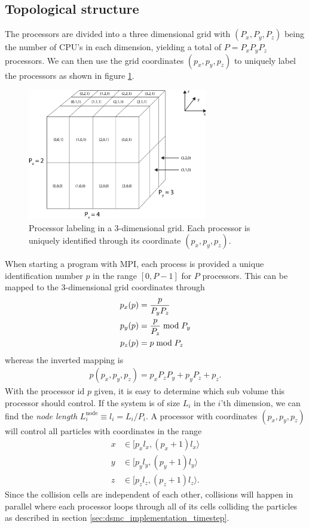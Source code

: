 \subsection{Topological structure}
The processors are divided into a three dimensional grid with $(P_x, P_y, P_z)$ being the number of CPU's in each dimension, yielding a total of $P = P_xP_yP_z$ processors. We can then use the grid coordinates $(p_x, p_y, p_z)$ to uniquely label the processors as shown in figure \ref{fig:dsmc_parallelization_2}.
\begin{figure}[htpb]
\begin{center}
\includegraphics[width=0.7\textwidth, trim=0cm 0cm 0cm 0cm, clip]{DSMC/figures/parallelization_node_configuration.eps}
\end{center}
\caption{Processor labeling in a 3-dimensional grid. Each processor is uniquely identified through its coordinate $(p_x, p_y, p_z)$.}
\label{fig:dsmc_parallelization_2}
\end{figure}
When starting a program with MPI, each process is provided a unique identification number $p$ in the range $[0, P-1]$ for $P$ processors. This can be mapped to the 3-dimensional grid coordinates through
\begin{align}
	\nonumber
	p_x(p) &= {p \over P_yP_z}\\
	\nonumber
	p_y(p) &= {p \over P_z} \bmod P_y\\
	p_z(p) &= p \bmod P_z
\end{align}
whereas the inverted mapping is 
\begin{align}
	p(p_x, p_y, p_z) = p_xP_zP_y + p_yP_z + p_z.
\end{align}
With the processor id $p$ given, it is easy to determine which sub volume this processor should control. If the system is of size $L_i$ in the $i$'th dimension, we can find the \textit{node length} $L_i^{\text{node}} \equiv l_i = L_i/P_i$. A processor with coordinates $(p_x, p_y, p_z)$ will control all particles with coordinates in the range
\begin{align}
	\nonumber
	x&\in[p_xl_x, (p_x+1)l_x\rangle\\
	\nonumber
	y&\in[p_yl_y, (p_y+1)l_y\rangle\\
	z&\in[p_zl_z, (p_z+1)l_z\rangle.
\end{align}
Since the collision cells are independent of each other, collisions will happen in parallel where each processor loops through all of its cells colliding the particles as described in section \ref{sec:dsmc_implementation_timestep}. 
